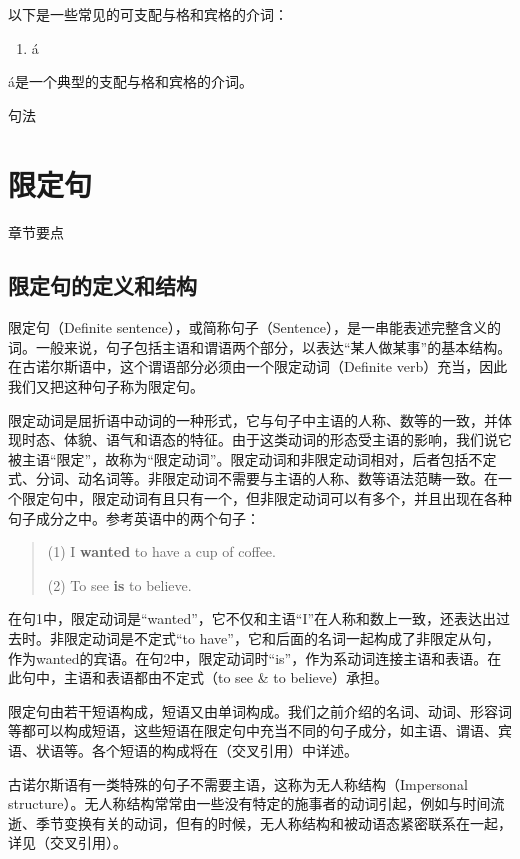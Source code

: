 {{以下是一些常见的可支配与格和宾格的介词：

\begin{enumerate}
\def\labelenumi{\arabic{enumi}.}
\item
  á
\end{enumerate}

á是一个典型的支配与格和宾格的介词。

句法

\section{限定句}\label{限定句}

章节要点

\subsection{限定句的定义和结构}\label{限定句的定义和结构}

限定句（Definite
sentence），或简称句子（Sentence），是一串能表述完整含义的词。一般来说，句子包括主语和谓语两个部分，以表达``某人做某事''的基本结构。在古诺尔斯语中，这个谓语部分必须由一个限定动词（Definite
verb）充当，因此我们又把这种句子称为限定句。

限定动词是屈折语中动词的一种形式，它与句子中主语的人称、数等的一致，并体现时态、体貌、语气和语态的特征。由于这类动词的形态受主语的影响，我们说它被主语``限定''，故称为``限定动词''。限定动词和非限定动词相对，后者包括不定式、分词、动名词等。非限定动词不需要与主语的人称、数等语法范畴一致。在一个限定句中，限定动词有且只有一个，但非限定动词可以有多个，并且出现在各种句子成分之中。参考英语中的两个句子：

\begin{quote}
(1) I \textbf{wanted} to have a cup of coffee.

(2) To see \textbf{is} to believe.
\end{quote}

在句1中，限定动词是``wanted''，它不仅和主语``I''在人称和数上一致，还表达出过去时。非限定动词是不定式``to
have''，它和后面的名词一起构成了非限定从句，作为wanted的宾语。在句2中，限定动词时``is''，作为系动词连接主语和表语。在此句中，主语和表语都由不定式（to
see \& to believe）承担。

限定句由若干短语构成，短语又由单词构成。我们之前介绍的名词、动词、形容词等都可以构成短语，这些短语在限定句中充当不同的句子成分，如主语、谓语、宾语、状语等。各个短语的构成将在（交叉引用）中详述。

古诺尔斯语有一类特殊的句子不需要主语，这称为无人称结构（Impersonal
structure）。无人称结构常常由一些没有特定的施事者的动词引起，例如与时间流逝、季节变换有关的动词，但有的时候，无人称结构和被动语态紧密联系在一起，详见（交叉引用）。

}}
